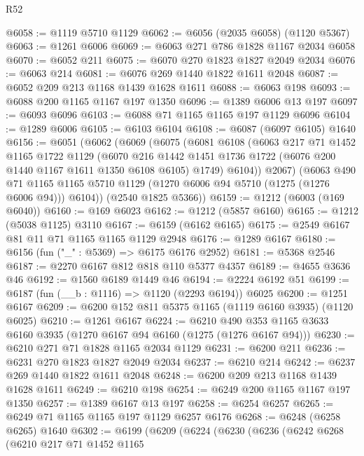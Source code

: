 \begin{lexlean}{R52}
\begin{coremodule}
@6058 := @1119 @5710 @1129
@6062 := @6056 (@2035 @6058) (@1120 @5367)
@6063 := @1261 @6006
@6069 := @6063 @271 @786 @1828 @1167 @2034 @6058
@6070 := @6052 @211
@6075 := @6070 @270 @1823 @1827 @2049 @2034
@6076 := @6063 @214
@6081 := @6076 @269 @1440 @1822 @1611 @2048
@6087 := @6052 @209 @213 @1168 @1439 @1628 @1611
@6088 := @6063 @198
@6093 := @6088 @200 @1165 @1167 @197 @1350
@6096 := @1389 @6006 @13 @197
@6097 := @6093 @6096
@6103 := @6088 @71 @1165 @1165 @197 @1129 @6096
@6104 := @1289 @6006
@6105 := @6103 @6104
@6108 := @6087 (@6097 @6105) @1640
@6156 := @6051
    (@6062
      (@6069
        (@6075
          (@6081
            @6108
            (@6063
              @217
              @71
              @1452
              @1165
              @1722
              @1129
              (@6070
                @216
                @1442
                @1451
                @1736
                @1722
                (@6076 @200 @1440 @1167 @1611 @1350 @6108 @6105)
                @1749)
              @6104))
          @2067)
        (@6063
          @490
          @71
          @1165
          @1165
          @5710
          @1129
          (@1270 @6006 @94 @5710 (@1275 (@1276 @6006 @94)))
          @6104))
      (@2540 @1825 @5366))
@6159 := @1212 (@6003 (@169 @6040))
@6160 := @169 @6023
@6162 := @1212 (@5857 @6160)
@6165 := @1212 (@5038 @1125) @3110
@6167 := @6159 (@6162 @6165)
@6175 := @2549 @6167 @81 @11 @71 @1165 @1165 @1129 @2948
@6176 := @1289 @6167
@6180 := @6156 (fun ("_" : @5369) => @6175 @6176 @2952)
@6181 := @5368 @2546
@6187 := @2270 @6167 @812 @818 @110 @5377 @4357
@6189 := @4655 @3636 @46
@6192 := @1560 @6189 @1449 @46
@6194 := @2224 @6192 @51
@6199 := @6187 (fun (__b : @1116) => @1120 (@2293 @6194)) @6025
@6200 := @1251 @6167
@6209 := @6200 @152 @811 @5375 @1165 (@1119 @6160 @3935) (@1120 @6025)
@6210 := @1261 @6167
@6224 := @6210 @490 @353 @1165 @3633 @6160 @3935 (@1270 @6167 @94 @6160 (@1275 (@1276 @6167 @94)))
@6230 := @6210 @271 @71 @1828 @1165 @2034 @1129
@6231 := @6200 @211
@6236 := @6231 @270 @1823 @1827 @2049 @2034
@6237 := @6210 @214
@6242 := @6237 @269 @1440 @1822 @1611 @2048
@6248 := @6200 @209 @213 @1168 @1439 @1628 @1611
@6249 := @6210 @198
@6254 := @6249 @200 @1165 @1167 @197 @1350
@6257 := @1389 @6167 @13 @197
@6258 := @6254 @6257
@6265 := @6249 @71 @1165 @1165 @197 @1129 @6257 @6176
@6268 := @6248 (@6258 @6265) @1640
@6302 := @6199
    (@6209
      (@6224
        (@6230
          (@6236
            (@6242
              @6268
              (@6210
                @217
                @71
                @1452
                @1165

\end{coremodule}
\end{lexlean}
